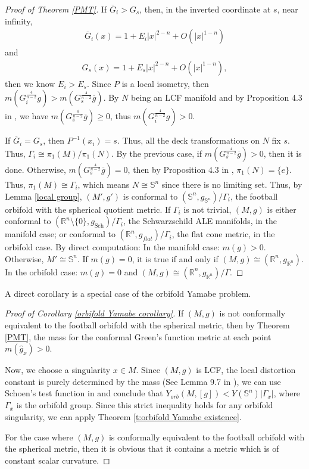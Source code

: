 \documentclass[12pt]{amsart}
\theoremstyle{definition}
\begin{document}
\begin{proof}[Proof of Theorem \ref{PMT}]
    If $\overline{G}_i>G_s$, then, in the inverted coordinate at $s$, near infinity, 
    \begin{align*}
            \overline{G}_i(x)=1+E_i|x|^{2-n}+O(|x|^{1-n})
    \end{align*}
    and
    \begin{align*}
            G_s(x)=1+E_s|x|^{2-n}+O(|x|^{1-n}),
    \end{align*}
    then we know $E_i>E_s$. Since $P$ is a local isometry, then $m(G_i^{\frac{4}{n-2}}g)>m(G_s^{\frac{4}{n-2}}\overline{g})$. By $N$ being an LCF manifold and by Proposition 4.3 in \cite{SYconformal}, we have $m(G_s^{\frac{4}{n-2}}\overline{g})\geq 0$, thus $m(G_i^{\frac{4}{n-2}}g)>0$.
    
    If $\overline{G}_i=G_s$, then $P^{-1}(x_i)=s$. Thus, all the deck transformations on $N$ fix $s$. Thus, $\Gamma_i\cong\pi_1(M)/\pi_1(N)$. By the previous case, if $m(G_s^{\frac{4}{n-2}}\overline{g})>0$, then it is done. Otherwise, $m(G_s^{\frac{4}{n-2}}\overline{g})=0$, then by Proposition 4.3 in \cite{SYconformal}, $\pi_1(N)=\{e\}$. Thus, $\pi_1(M)\cong \Gamma_i$, which means $N\cong \mathbb{S}^n$ since there is no limiting set. Thus, by Lemma \ref{local group}, $(M',g')$ is conformal to $(\mathbb{S}^n,g_{\mathbb{S}^n})/\Gamma_i$, the football orbifold with the spherical quotient metric. If $\Gamma_i$ is not trivial, $(M,g)$ is either conformal to $(\mathbb{R}^n\setminus\{0\},g_{\text{Sch}})/\Gamma_i$, the Schwarzschild ALE manifolds, in the manifold case; or conformal to $(\mathbb{R}^n, g_{flat})/\Gamma_i$, the flat cone metric, in the orbifold case. By direct computation: In the manifold case: $m(g)>0$. Otherwise, $M'\cong \mathbb{S}^n$. If $m(g)=0$, it is true if and only if $(M,g)\cong (\mathbb{R}^n,g_{\mathbb{R}^n})$. In the orbifold case: $m(g) = 0$ and $(M,g)\cong (\mathbb{R}^n, g_{\mathbb{R}^n})/\Gamma$.
\end{proof}

A direct corollary is a special case of the orbifold Yamabe problem. 

\begin{proof}[Proof of Corollary \ref{orbifold Yamabe corollary}]
        If $(M,g)$ is not conformally equivalent to the football orbifold with the spherical metric, then by Theorem \ref{PMT}, the mass for the conformal Green's function metric at each point $m(\hat{g}_x)>0$.
        
        Now, we choose a singularity $x\in M$. Since $(M,g)$ is LCF, the local distortion constant is purely determined by the mass (See Lemma 9.7 in \cite{lee1987yamabe}), we can use Schoen's test function in \cite{Sch84} and conclude that $Y_{orb}(M,[g])<Y(\mathbb{S}^n)|\Gamma_x|$, where $\Gamma_x$ is the orbifold group. Since this strict inequality holds for any orbifold singularity, we can apply Theorem \ref{t:orbifold Yamabe existence}.  
        
        For the case where $(M,g)$ is conformally equivalent to the football orbifold with the spherical metric, then it is obvious that it contains a metric which is of constant scalar curvature.
\end{proof}
\end{document}
